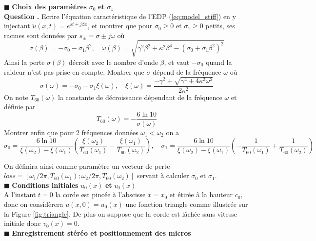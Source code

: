 \documentclass[a4,12pt]{article}
\newcounter{Nbquestion}
\newcommand*\question{%
\stepcounter{Nbquestion}%
\textbf{Question \theNbquestion. }}
\begin{document}
  \hspace{0.5cm} $\blacksquare$ \textbf{Choix des paramètres} $\sigma_0$  \textbf{et}  $\sigma_1$\\


  \question Ecrire l'équation caractéristique de l'EDP (\ref{eq:model_stiff}) en y injectant $\tilde u(x,t)=e^{st+j\beta x}$, et montrer que pour $\sigma_0\geqslant 0$ et $\sigma_1\geqslant 0$ petits, ses racines sont données par $s_{\pm}=\sigma\pm j\omega$ où 
  \[
    \sigma(\beta)=-\sigma_0-\sigma_1\beta^2,\quad \omega(\beta)=\sqrt{\gamma^2 \beta^2+\kappa^2\beta^4-(\sigma_0+\sigma_1\beta^2)^2}
  \]
  Ainsi la perte $\sigma(\beta)$ décroît avec le nombre d'onde $\beta$, et vaut $-\sigma_0$ quand la raideur n'est pas prise en compte.  Montrer que $\sigma$ dépend de la fréquence $\omega$ où 
  \[
    \sigma(\omega)=-\sigma_0-\sigma_1\xi (\omega),\quad \xi(\omega)=\frac{-\gamma^2+\sqrt{\gamma^4+4\kappa^2 \omega^2}}{2\kappa^2}
  \]
  On note $T_{60}(\omega)$ la constante de décroissance dépendant de la fréquence $\omega$ et définie par 
  \[
    T_{60}(\omega)=-\frac{6\ln 10}{\sigma(\omega)}
  \]
  Montrer enfin que pour 2 fréquences données $\omega_1<\omega_2$ on a 
  \[
    \sigma_0=\frac{6 \ln 10}{\xi(\omega_2)-\xi(\omega_1)}\left(\frac{\xi(\omega_2)}{T_{60}(\omega_1)}-\frac{\xi(\omega_1)}{T_{60}(\omega_2)}\right), \quad \sigma_1=\frac{6 \ln 10}{\xi(\omega_2)-\xi(\omega_1)}\left(-\frac{1}{T_{60}(\omega_1)}+\frac{1}{T_{60}(\omega_2)}\right)
  \]


  On définira ainsi comme paramètre un vecteur de perte $loss=[\omega_1/2\pi,T_{60}(\omega_1) ; \omega_2/2\pi,T_{60}(\omega_2)]$ servant à calculer $\sigma_0$ et $\sigma_1$. \\

  \hspace{0.5cm} $\blacksquare$ \textbf{Conditions initiales} $u_0(x)$ \textbf{et} $v_0(x)$\\

  A l'instant $t=0$ la corde est pincée à l'abscisse $x=x_0$ et étirée à la hauteur $c_0$, donc on considèrera $u(x,0)=u_0(x)$ une fonction triangle comme illustrée sur la Figure \ref{fig:triangle}. De plus on suppose que la corde est lâchée sans vitesse initiale donc $v_0(x)=0$.\\


  \hspace{0.5cm} $\blacksquare$ \textbf{Enregistrement stéréo et positionnement des micros}\\
\end{document}
